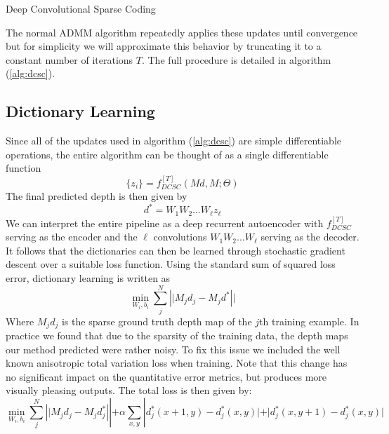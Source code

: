 \begin{algorithm}
  \caption{Deep Convolutional Sparse Coding}
  \label{alg:dcsc}
\end{algorithm}

The normal ADMM algorithm repeatedly applies these updates until convergence but for simplicity we will approximate this behavior by truncating it to a constant number of iterations $T$. The full procedure is detailed in algorithm (\ref{alg:dcsc}).

\subsection{Dictionary Learning}
\label{sec:dictionary-learning}

Since all of the updates used in algorithm (\ref{alg:dcsc}) are simple differentiable operations, the entire algorithm can be thought of as a single differentiable function
\begin{equation}
  \label{eq:7}
  \{ z_i \} = f^{[T]}_{DCSC}(Md, M; \Theta)
\end{equation}
The final predicted depth is then given by
\begin{equation}
  \label{eq:8}
  d^{*} = W_1W_2\ldots W_{\ell}z_{\ell}
\end{equation}
We can interpret the entire pipeline as a deep recurrent autoencoder with  $f^{[T]}_{DCSC}$ serving as the encoder and the $\ell$ convolutions $W_1W_2\ldots W_{\ell}$ serving as the decoder. It follows that the dictionaries can then be learned through stochastic gradient descent over a suitable loss function. Using the standard sum of squared loss error, dictionary learning is written as
\begin{equation}
  \label{eq:9}
  \min_{W_i, b_i} \sum_j^{N}\left||M_{j}d_j - M_jd^{*}\right||
\end{equation}
Where $M_jd_j$ is the sparse ground truth depth map of the $j$th training example. In practice we found that due to the sparsity of the training data, the depth maps our method predicted were rather noisy. To fix this issue we included the well known anisotropic total variation loss when training. Note that this change has no significant impact on the quantitative error metrics, but produces more visually pleasing outputs. The total loss is then given by:
\begin{equation}
  \label{eq:9}
  \min_{W_i, b_i} \sum_j^{N}\left||M_{j}d_j - M_jd_j^{*}\right|| + \alpha\sum_{x,y} |d_j^*(x+1, y) - d_j^*(x, y)| + |d_j^*(x, y+1) - d_j^*(x, y)|
\end{equation}